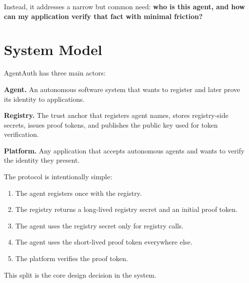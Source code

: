 \documentclass[11pt]{article}
\begin{document}
Instead, it addresses a narrow but common need: \textbf{who is this agent, and how can my application verify that fact with minimal friction?}

\section{System Model}

AgentAuth has three main actors:

\textbf{Agent.} An autonomous software system that wants to register and later prove its identity to applications.

\textbf{Registry.} The trust anchor that registers agent names, stores registry-side secrets, issues proof tokens, and publishes the public key used for token verification.

\textbf{Platform.} Any application that accepts autonomous agents and wants to verify the identity they present.

The protocol is intentionally simple:

\begin{enumerate}
  \item The agent registers once with the registry.
  \item The registry returns a long-lived registry secret and an initial proof token.
  \item The agent uses the registry secret only for registry calls.
  \item The agent uses the short-lived proof token everywhere else.
  \item The platform verifies the proof token.
\end{enumerate}

This split is the core design decision in the system.
\end{document}

